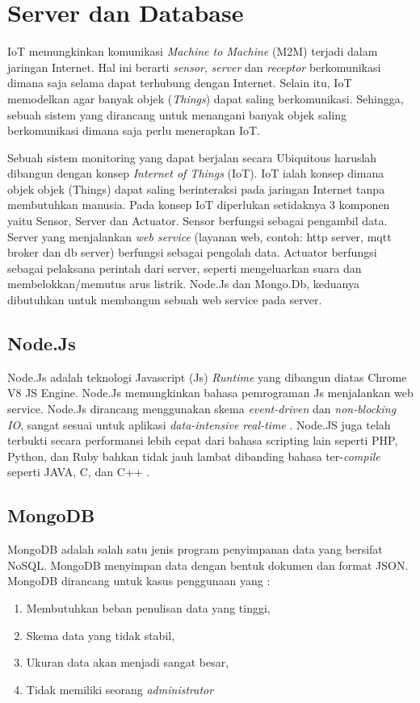 \section{Server dan Database}
IoT memungkinkan komunikasi \textit{Machine to Machine} (M2M) terjadi dalam jaringan Internet. Hal ini berarti \textit{sensor}, \textit{server} dan \textit{receptor} berkomunikasi dimana saja selama dapat terhubung dengan Internet. Selain itu, IoT memodelkan agar banyak objek (\textit{Things}) dapat saling berkomunikasi. Sehingga, sebuah sistem yang dirancang untuk menangani banyak objek saling berkomunikasi dimana saja perlu menerapkan IoT.

Sebuah sistem monitoring yang dapat berjalan secara Ubiquitous haruslah dibangun dengan konsep \textit{Internet of Things} (IoT). IoT ialah konsep dimana objek objek (Things) dapat saling berinteraksi pada jaringan Internet tanpa membutuhkan manusia. Pada konsep IoT diperlukan setidaknya 3 komponen yaitu Sensor, Server dan Actuator. Sensor berfungsi sebagai pengambil data. Server yang menjalankan \textit{web service} (layanan web, contoh: http server, mqtt broker dan db server) berfungsi sebagai pengolah data. Actuator berfungsi sebagai pelaksana perintah dari server, seperti mengeluarkan suara dan membelokkan/memutus arus listrik. Node.Js dan Mongo.Db, keduanya dibutuhkan untuk membangun sebuah web service pada server.

\subsection{Node.Js}
Node.Js adalah teknologi Javascript (Js) \textit{Runtime} yang dibangun diatas Chrome V8 JS Engine. Node.Js memungkinkan bahasa pemrograman Js menjalankan web service. Node.Js dirancang menggunakan skema \textit{event-driven} dan \textit{non-blocking IO}, sangat sesuai untuk aplikasi \textit{data-intensive real-time} \cite{nodejs}. Node.JS juga telah terbukti secara performansi lebih cepat dari bahasa scripting lain seperti PHP, Python, dan Ruby bahkan tidak jauh lambat dibanding bahasa ter-\textit{compile} seperti JAVA, C, dan C++ \cite{node_comparisson}.

\subsection{MongoDB}
MongoDB adalah salah satu jenis program penyimpanan data yang bersifat NoSQL. MongoDB menyimpan data dengan bentuk dokumen dan format JSON. MongoDB dirancang untuk kasus penggunaan yang \cite{why_mongo}:
\begin{enumerate}
	\item Membutuhkan beban penulisan data yang tinggi,
	\item Skema data yang tidak stabil,
	\item Ukuran data akan menjadi sangat besar,
	\item Tidak memiliki seorang \textit{administrator}
\end{enumerate}

